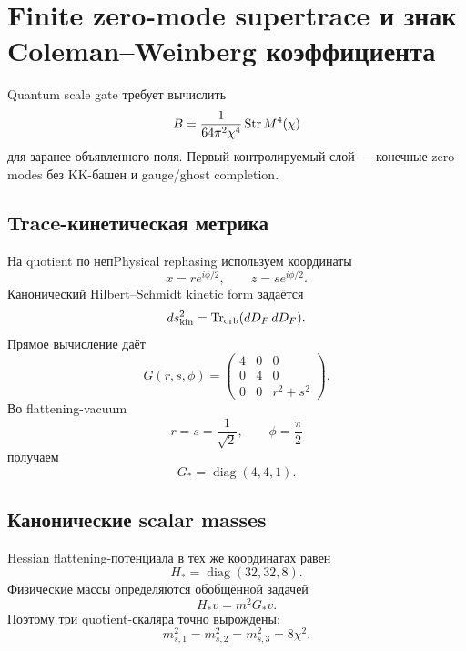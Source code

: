 \chapter{Finite zero-mode supertrace и знак Coleman--Weinberg коэффициента}

Quantum scale gate требует вычислить
\begin{equation}
 B=\frac1{64\pi^2\chi^4}\operatorname{Str} M^4(\chi)
\end{equation}
для заранее объявленного поля. Первый контролируемый слой --- конечные
zero-modes без KK-башен и gauge/ghost completion.

\section{Trace-кинетическая метрика}

На quotient по непPhysical rephasing используем координаты
\begin{equation}
 x=re^{i\phi/2},
 \qquad
 z=se^{i\phi/2}.
\end{equation}
Канонический Hilbert--Schmidt kinetic form задаётся
\begin{equation}
 ds^2_{\mathrm{kin}}
 =\operatorname{Tr}_{\mathrm{orb}}(dD_F\,dD_F).
\end{equation}
Прямое вычисление даёт
\begin{equation}
 G(r,s,\phi)
 =
 \begin{pmatrix}
 4&0&0\\
 0&4&0\\
 0&0&r^2+s^2
 \end{pmatrix}.
\end{equation}
Во flattening-vacuum
\begin{equation}
 r=s=\frac1{\sqrt2},
 \qquad
 \phi=\frac{\pi}{2}
\end{equation}
получаем
\begin{equation}
 G_*=\operatorname{diag}(4,4,1).
\end{equation}

\section{Канонические scalar masses}

Hessian flattening-потенциала в тех же координатах равен
\begin{equation}
 H_*=\operatorname{diag}(32,32,8).
\end{equation}
Физические массы определяются обобщённой задачей
\begin{equation}
 H_*v=m^2G_*v.
\end{equation}
Поэтому три quotient-скаляра точно вырождены:
\begin{equation}
 m_{s,1}^2=m_{s,2}^2=m_{s,3}^2=8\chi^2.
\end{equation}

